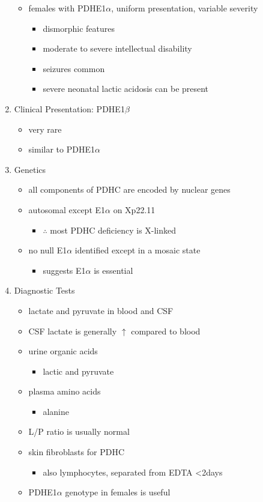 \documentclass{scrartcl}
\begin{document}
\begin{enumerate}
\begin{itemize}
\item females with PDHE1\(\alpha\), uniform presentation, variable severity
\begin{itemize}
\item dismorphic features
\item moderate to severe intellectual disability
\item seizures common
\item severe neonatal lactic acidosis can be present
\end{itemize}
\end{itemize}

\item Clinical Presentation: PDHE1\(\beta\)
\label{sec:orgccad2a7}
\begin{itemize}
\item very rare
\item similar to PDHE1\(\alpha\)
\end{itemize}

\item Genetics
\label{sec:orgd04e814}
\begin{itemize}
\item all components of PDHC are encoded by nuclear genes
\item autosomal except E1\(\alpha\) on Xp22.11
\begin{itemize}
\item \(\therefore\) most PDHC deficiency is X-linked
\end{itemize}
\item no null E1\(\alpha\) identified except in a mosaic state
\begin{itemize}
\item suggests E1\(\alpha\) is essential
\end{itemize}
\end{itemize}

\item Diagnostic Tests
\label{sec:org7a0f6cf}
\begin{itemize}
\item lactate and pyruvate in blood and CSF
\item CSF lactate is generally \(\uparrow\) compared to blood
\item urine organic acids
\begin{itemize}
\item lactic and pyruvate
\end{itemize}
\item plasma amino acids
\begin{itemize}
\item alanine
\end{itemize}
\item L/P ratio is usually normal
\item skin fibroblasts for PDHC
\begin{itemize}
\item also lymphocytes, separated from EDTA <2days
\end{itemize}
\item PDHE1\(\alpha\) genotype in females is useful
\end{itemize}


\end{enumerate}
\end{document}
